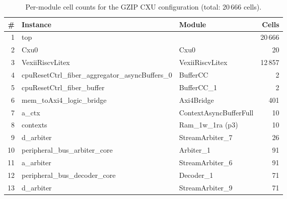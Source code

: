 \begin{table}[!htbp]
\centering
\caption{Per-module cell counts for the GZIP CXU configuration (total: 20\,666 cells).}
\label{tab:area_gzip}
\small
\begin{tabular}{rllr}
\toprule
\textbf{\#} & \textbf{Instance} & \textbf{Module} & \textbf{Cells} \\
\midrule
1  & top                                                                 &                                                  & 20\,666 \\
2  & \quad Cxu0                                                          & Cxu0                                             &     20 \\
3  & \quad VexiiRiscvLitex                                               & VexiiRiscvLitex                                  & 12\,857 \\
4  & \quad\quad cpuResetCtrl\_fiber\_aggregator\_asyncBuffers\_0         & BufferCC                                         &      2 \\
5  & \quad\quad cpuResetCtrl\_fiber\_buffer                              & BufferCC\_1                                      &      2 \\
6  & \quad\quad mem\_toAxi4\_logic\_bridge                               & Axi4Bridge                                       &    401 \\
7  & \quad\quad\quad a\_ctx                                              & ContextAsyncBufferFull                           &     10 \\
8  & \quad\quad\quad\quad contexts                                       & Ram\_1w\_1ra (p3)                                &     10 \\
9  & \quad\quad\quad d\_arbiter                                          & StreamArbiter\_7                                 &     26 \\
10 & \quad\quad peripheral\_bus\_arbiter\_core                           & Arbiter\_1                                       &     91 \\
11 & \quad\quad\quad a\_arbiter                                          & StreamArbiter\_6                                 &     91 \\
12 & \quad\quad peripheral\_bus\_decoder\_core                           & Decoder\_1                                       &     71 \\
13 & \quad\quad\quad d\_arbiter                                          & StreamArbiter\_9                                 &     71 \\

\end{tabular}
\end{table}
